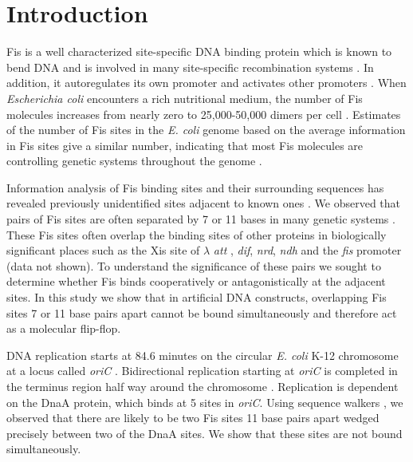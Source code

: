 \documentclass[doublespacing]{narfront}
\begin{document}

\section*{Introduction}

Fis is a well characterized site-specific DNA binding protein
which is known to bend DNA
and is involved in many site-specific recombination systems
\cite{Johnson.Simon1987}.
In addition, it autoregulates its own promoter
and activates other promoters
\cite{Finkel1992,Finkel1992.erratum}.
When \emph{Escherichia coli} encounters a rich
nutritional medium, the number of Fis molecules
increases from nearly zero to 25,000-50,000 dimers
per cell
\cite{Ball1992}.
Estimates of the number of Fis sites in the
\emph{E. coli} genome based on the average information
in Fis sites give a similar number, indicating that
most Fis molecules are controlling genetic
systems throughout the genome
\cite{Hengen.fisinfo,Travers.Muskhelishvili2001,Ussery.Brunak2001,Dorman.Deighan2003}.

Information analysis of Fis binding sites
and their surrounding sequences
has revealed previously unidentified
sites adjacent to known ones
\cite{Hengen.fisinfo}.
We observed that pairs of Fis sites are often separated
by 7 or 11 bases in many genetic systems
\cite{Hengen.fisinfo,Schneider.Mastronarde.malign}.
These
Fis sites
often overlap
the binding sites of other proteins
in biologically significant places such as
the Xis site of
$\lambda$ \emph{att}
\cite{Schneider.walker},
\emph{dif},
\emph{nrd},
\emph{ndh}
and the
\emph{fis} promoter (data not shown).
To understand the
significance of these pairs
we sought to determine whether Fis binds cooperatively
or antagonistically at the adjacent sites.
In this study we show that
in artificial DNA constructs,
overlapping Fis sites 7 or 11 base pairs apart
cannot be bound simultaneously
and therefore act as a molecular flip-flop.

DNA replication starts at 84.6 minutes on the
circular \emph{E. coli} K-12 chromosome
at a locus called \emph{oriC} \cite{Messer.Weigel1996,Baker.Bell1998}.
Bidirectional replication starting at
\emph{oriC}
\cite{Prescott.Kuempel1972,Bird.Caro1972}
is completed in the terminus region
half way around the chromosome \cite{Hill1996}.
Replication is dependent on the DnaA protein,
which binds at 5 sites in 
\emph{oriC}.
Using sequence 
walkers
\cite{Schneider.walker},
we observed that there are likely to be two
Fis sites 11 base pairs apart
wedged precisely between two of the DnaA sites.
We show that these sites are not bound simultaneously.
\end{document}
